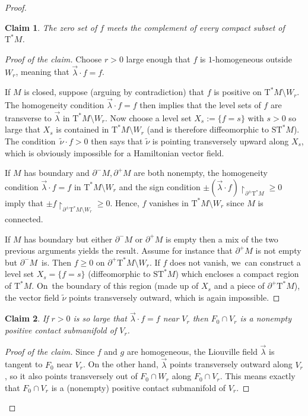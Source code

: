 \documentclass[10pt]{amsart}
\newcommand{\sT}{\mathrm{T}^\ast}
\newcommand{\sST}{\mathrm{ST}^\ast}
\newcommand{\hnu}{\tilde\nu}
\newcommand{\de}{\mathrel{:=}}
\newcommand{\rst}[1]{{\upharpoonright}_{\!#1}}
\let\del\partial
\theoremstyle{plain}
\newtheorem*{claim}{Claim}
\theoremstyle{definition}
\begin{document}
\begin{proof}
\begin{claim}
The zero set of $f$ meets the complement of every compact subset of $\sT M$.
\end{claim}

\begin{proof}[Proof of the claim]
Choose $r>0$ large enough that $f$ is $1$-homogeneous outside~$W_r$, meaning
that $\vec\lambda \cdot f = f$.

If $M$ is closed, suppose (arguing by contradiction) that $f$ is positive on
$\sT M \setminus W_r$. The homogeneity condition $\vec\lambda \cdot f = f$ then implies
that the level sets of $f$ are transverse to $\vec\lambda$ in $\sT M \setminus W_r$. Now
choose a level set $X_s \de \{f=s\}$ with $s>0$ so large that $X_s$ is contained
in $\sT M \setminus W_r$ (and is therefore diffeomorphic to $\sST M$). The condition~$\hnu \cdot f > 0$ then says that $\hnu$ is pointing transversely upward along
$X_s$, which is obviously impossible for a Hamiltonian vector field.

If $M$ has boundary and $\del^-M, \del^+M$ are both nonempty, the homogeneity
condition $\vec\lambda \cdot f = f$ in $\sT M \setminus W_r$ and the sign condition $\pm
(\vec\lambda \cdot f) \rst{ \del^\pm \sT M } \ge 0$ imply that $\pm f \rst{
\del^\pm\sT M\setminus W_r } \ge 0$. Hence, $f$ vanishes in $\sT M \setminus W_r$ since $M$ is
connected.

If $M$ has boundary but either $\del^-M$ or $\del^+M$ is empty then a mix of the
two previous arguments yields the result. Assume for instance that $\del^+M$ is
not empty but $\del^-M$~is. Then $f \ge 0$ on $\del^+\sT M \setminus W_r$. If $f$ does
not vanish, we~can construct a level set $X_s = \{f=s\}$ (diffeomorphic to $\sST
M$) which encloses a compact region of $\sT M$. On~the boundary of this region
(made up of $X_s$ and a piece of $\del^+\sT M$), the vector field $\hnu$ points
transversely outward, which is again impossible.
\end{proof}

\begin{claim}
If $r>0$ is so large that $\vec\lambda \cdot f = f$ near $V_r$ then $F_0 \cap
V_r$ is a nonempty positive contact submanifold of $V_r$.
\end{claim}

\begin{proof}[Proof of the claim]
Since $f$ and $g$ are homogeneous, the Liouville field $\vec\lambda$ is tangent
to $F_0$ near $V_r$. On the other hand, $\vec\lambda$ points transversely
outward along $V_r$, so it also points transversely out of $F_0 \cap W_r$ along
$F_0 \cap V_r$. This means exactly that $F_0 \cap V_r$ is a
(nonempty) positive contact submanifold of $V_r$.
\end{proof}


\end{proof}
\end{document}
